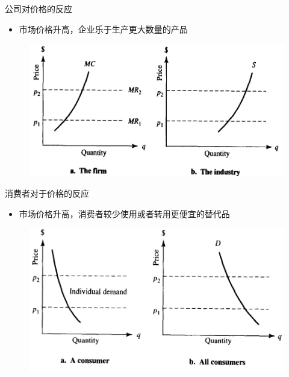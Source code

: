 \documentclass[mathserif, table]{beamer}
\begin{document}
\begin{frame}{公司对价格的反应}

  \begin{itemize}
  \item 市场价格升高，企业乐于生产更大数量的产品
  \end{itemize}
  
  \begin{figure}
    \centering
    \includegraphics[width=.7\textwidth]{ap.png}
  \end{figure}

\end{frame}

\begin{frame}{消费者对于价格的反应}

  \begin{itemize}
  \item 市场价格升高，消费者较少使用或者转用更便宜的替代品
  \end{itemize}

  \begin{figure}
    \centering
    \includegraphics[width=.7\textwidth]{cp.png}
  \end{figure}
  
\end{frame}
\end{document}
